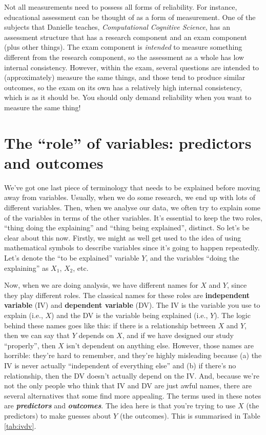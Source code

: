 \documentclass[
]{book}
\theoremstyle{definition}
\theoremstyle{definition}
\theoremstyle{definition}
\theoremstyle{definition}
\theoremstyle{remark}
\begin{document}
Not all measurements need to possess all forms of reliability. For instance, educational assessment can be thought of as a form of measurement. One of the subjects that Danielle teaches, \emph{Computational Cognitive Science}, has an assessment structure that has a research component and an exam component (plus other things). The exam component is \emph{intended} to measure something different from the research component, so the assessment as a whole has low internal consistency. However, within the exam, several questions are intended to (approximately) measure the same things, and those tend to produce similar outcomes, so the exam on its own has a relatively high internal consistency, which is as it should be. You should only demand reliability when you want to measure the same thing!

\hypertarget{ivdv}{%
\section{The ``role'' of variables: predictors and outcomes}\label{ivdv}}

We've got one last piece of terminology that needs to be explained before moving away from variables. Usually, when we do some research, we end up with lots of different variables. Then, when we analyse our data, we often try to explain some of the variables in terms of the other variables. It's essential to keep the two roles, ``thing doing the explaining'' and ``thing being explained'', distinct. So let's be clear about this now. Firstly, we might as well get used to the idea of using mathematical symbols to describe variables since it's going to happen repeatedly. Let's denote the ``to be explained'' variable \(Y\), and the variables ``doing the explaining'' as \(X_1\), \(X_2\), etc.

Now, when we are doing analysis, we have different names for \(X\) and \(Y\), since they play different roles. The classical names for these roles are \textbf{independent variable} (IV) and \textbf{dependent variable} (DV). The IV is the variable you use to explain (i.e., \(X\)) and the DV is the variable being explained (i.e., \(Y\)). The logic behind these names goes like this: if there is a relationship between \(X\) and \(Y\), then we can say that \(Y\) depends on \(X\), and if we have designed our study ``properly'', then \(X\) isn't dependent on anything else. However, those names are horrible: they're hard to remember, and they're highly misleading because (a) the IV is never actually ``independent of everything else'' and (b) if there's no relationship, then the DV doesn't actually depend on the IV. And, because we're not the only people who think that IV and DV are just awful names, there are several alternatives that some find more appealing. The terms used in these notes are \textbf{\emph{predictors}} and \textbf{\emph{outcomes}}. The idea here is that you're trying to use \(X\) (the predictors) to make guesses about \(Y\) (the outcomes). This is summarised in Table \ref{tab:ivdv}.
\end{document}
